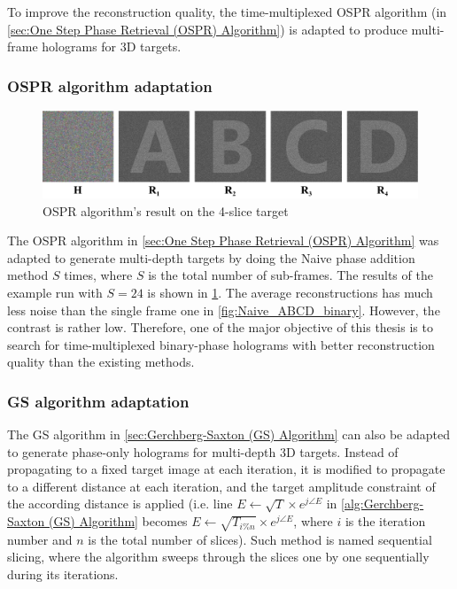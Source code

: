 To improve the reconstruction quality, the time-multiplexed OSPR algorithm (in \cref{sec:One Step Phase Retrieval (OSPR) Algorithm}) is adapted to produce multi-frame holograms for 3D targets.


\subsubsection{OSPR algorithm adaptation}
\begin{figure}[H]
	\centering
	\includegraphics[width=1.0\textwidth]{ABCD/OSPR_ABCD.pdf}
	\caption{OSPR algorithm's result on the 4-slice target}
	\label{fig:OSPR_ABCD}
\end{figure}

The OSPR algorithm in \cref{sec:One Step Phase Retrieval (OSPR) Algorithm} was adapted to generate multi-depth targets by doing the Naive phase addition method $S$ times, where $S$ is the total number of sub-frames. The results of the example run with $S=24$ is shown in \cref{fig:OSPR_ABCD}. The average reconstructions has much less noise than the single frame one in \cref{fig:Naive_ABCD_binary}. However, the contrast is rather low. Therefore, one of the major objective of this thesis is to search for time-multiplexed binary-phase holograms with better reconstruction quality than the existing methods.

\subsubsection{GS algorithm adaptation} \label{sec:GS algorithm adaptation}
The GS algorithm in \cref{sec:Gerchberg-Saxton (GS) Algorithm} can also be adapted to generate phase-only holograms for multi-depth 3D targets. Instead of propagating to a fixed target image at each iteration, it is modified to propagate to a different distance at each iteration, and the target amplitude constraint of the according distance is applied (i.e. line $E \gets \sqrt{T} \times e^{j\angle E}$ in \cref{alg:Gerchberg-Saxton (GS) Algorithm} becomes $E \gets \sqrt{T_{i\%n}} \times e^{j\angle E}$, where $i$ is the iteration number and $n$ is the total number of slices). Such method is named sequential slicing, where the algorithm sweeps through the slices one by one sequentially during its iterations.

